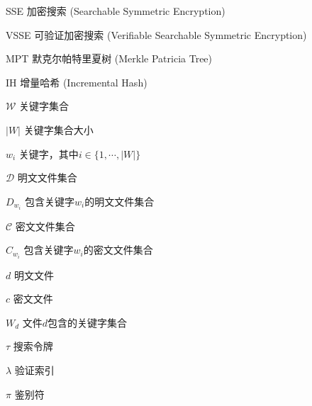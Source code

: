 \begin{denotation}[3cm]
\item[SSE] 加密搜索 (Searchable Symmetric Encryption)
\item[VSSE] 可验证加密搜索 (Verifiable Searchable Symmetric Encryption)
\item[MPT] 默克尔帕特里夏树 (Merkle Patricia Tree)
\item[IH] 增量哈希 (Incremental Hash)
\item[$\mathcal{W}$] 关键字集合
\item[$|W|$] 关键字集合大小
\item[$w_i$ ] 关键字，其中$i \in \{1, \cdots, |W|\}$
\item[$\mathcal{D}$] 明文文件集合
\item[$D_{w_i}$] 包含关键字$w_i$的明文文件集合
\item[$\mathcal{C}$] 密文文件集合
\item[$C_{w_i}$] 包含关键字$w_i$的密文文件集合
\item[$d$] 明文文件
\item[$c$] 密文文件
\item[$W_d$] 文件$d$包含的关键字集合
\item[$\tau$]	搜索令牌
\item[$\lambda$] 验证索引
\item[$\pi$] 鉴别符
\end{denotation}
